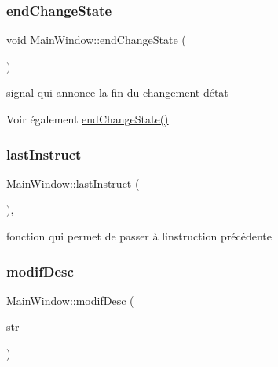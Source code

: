 \subsubsection{\texorpdfstring{end\+Change\+State}{endChangeState}}
{\footnotesize\ttfamily void Main\+Window\+::end\+Change\+State (\begin{DoxyParamCaption}{ }\end{DoxyParamCaption})\hspace{0.3cm}{\ttfamily [signal]}}



signal qui annonce la fin du changement d\textquotesingle{}état 

\begin{DoxySeeAlso}{Voir également}
\hyperlink{classMainWindow_a2cd7fd54c497cd6a073ad43857266890}{end\+Change\+State()} 
\end{DoxySeeAlso}
\mbox{\label{classMainWindow_a715f753a6c46e3f10565a5a1b849ee86}} 
\subsubsection{\texorpdfstring{last\+Instruct}{lastInstruct}}
{\footnotesize\ttfamily Main\+Window\+::last\+Instruct (\begin{DoxyParamCaption}{ }\end{DoxyParamCaption})\hspace{0.3cm}{\ttfamily [private]}, {\ttfamily [slot]}}



fonction qui permet de passer à l\textquotesingle{}instruction précédente 

\mbox{\label{classMainWindow_a77ada7a541d869ea7f3647900ba6f6df}} 
\subsubsection{\texorpdfstring{modif\+Desc}{modifDesc}}
{\footnotesize\ttfamily Main\+Window\+::modif\+Desc (\begin{DoxyParamCaption}\item[{Q\+String}]{str }\end{DoxyParamCaption})\hspace{0.3cm}{\ttfamily [slot]}}



